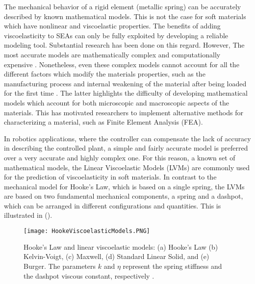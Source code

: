 The mechanical behavior of a rigid element (metallic spring) can be accurately described by known mathematical models. This is not the case for soft materials which have nonlinear and viscoelastic properties. The benefits of adding viscoelasticity to SEAs can only be fully exploited by developing a  reliable modeling tool. Substantial research has been done on this regard. However, The most accurate models are mathematically complex and computationally expensive \cite{xu2014mathematical,ciniello2017identifying,lu2017constitutive}. Nonetheless, even these complex models cannot account for all the different  factors which modify the materials properties, such as the manufacturing process and internal weakening of the material after being loaded for the first time \cite{case2015soft}. The latter highlights the difficulty of developing mathematical models which account for both microscopic and macroscopic aspects of the materials. This has motivated researchers to implement alternative methods for characterizing a material, such as Finite Element Analysis (FEA).

In robotics applications, where the controller can compensate the lack of accuracy in describing the controlled plant, a simple and fairly accurate model is preferred over a very accurate and highly complex one. For this reason, a known set of mathematical models, the Linear Viscoelastic Models (LVMs) are commonly used for the prediction of viscoelasticity in soft materials. In contrast to the mechanical model for Hooke's Law, which is based on a single spring, the LVMs are based on two fundamental mechanical components, a spring and a dashpot, which can be arranged in different configurations and quantities. This is illustrated in ().

\begin{figure}[hbt!]
	\centering
    \texttt{[image: HookeViscoelasticModels.PNG]}
    \caption{Hooke's Law and linear viscoelastic models: (a) Hooke's Law (b) Kelvin-Voigt, (c) Maxwell, (d) Standard Linear Solid, and (e) Burger. The parameters $k$ and $\eta$ represent the spring stiffness and the dashpot viscous constant, respectively \cite{austin2015control}. }
    \label{fig:LinearViscoelasticModels}
\end{figure}

